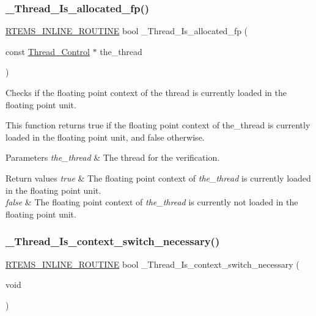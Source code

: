 \subsubsection{\texorpdfstring{\_Thread\_Is\_allocated\_fp()}{\_Thread\_Is\_allocated\_fp()}}
{\footnotesize\ttfamily \mbox{\hyperlink{group__RTEMSScoreBaseDefs_gac216239df231d5dbd15e3520b0b9313f}{R\+T\+E\+M\+S\+\_\+\+I\+N\+L\+I\+N\+E\+\_\+\+R\+O\+U\+T\+I\+NE}} bool \+\_\+\+Thread\+\_\+\+Is\+\_\+allocated\+\_\+fp (\begin{DoxyParamCaption}\item[{const \mbox{\hyperlink{struct__Thread__Control}{Thread\+\_\+\+Control}} $\ast$}]{the\+\_\+thread }\end{DoxyParamCaption})}



Checks if the floating point context of the thread is currently loaded in the floating point unit. 

This function returns true if the floating point context of the\+\_\+thread is currently loaded in the floating point unit, and false otherwise.


\begin{DoxyParams}{Parameters}
{\em the\+\_\+thread} & The thread for the verification.\\
\hline
\end{DoxyParams}

\begin{DoxyRetVals}{Return values}
{\em true} & The floating point context of {\itshape the\+\_\+thread} is currently loaded in the floating point unit. \\
\hline
{\em false} & The floating point context of {\itshape the\+\_\+thread} is currently not loaded in the floating point unit. \\
\hline
\end{DoxyRetVals}
\mbox{\label{group__RTEMSScoreThread_ga960061380ad461173f7f190e9d75385d}} 
\subsubsection{\texorpdfstring{\_Thread\_Is\_context\_switch\_necessary()}{\_Thread\_Is\_context\_switch\_necessary()}}
{\footnotesize\ttfamily \mbox{\hyperlink{group__RTEMSScoreBaseDefs_gac216239df231d5dbd15e3520b0b9313f}{R\+T\+E\+M\+S\+\_\+\+I\+N\+L\+I\+N\+E\+\_\+\+R\+O\+U\+T\+I\+NE}} bool \+\_\+\+Thread\+\_\+\+Is\+\_\+context\+\_\+switch\+\_\+necessary (\begin{DoxyParamCaption}\item[{void}]{ }\end{DoxyParamCaption})}



